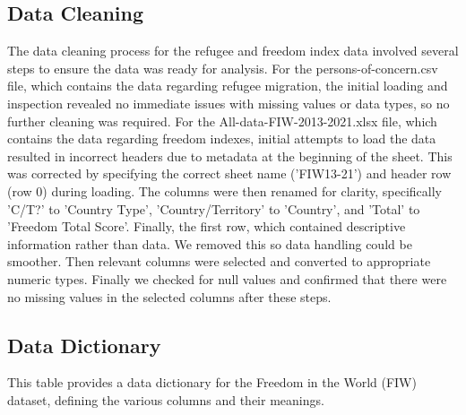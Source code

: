 \documentclass{article}
\theoremstyle{plain}
\theoremstyle{definition}
\theoremstyle{remark}
\begin{document}
\subsection{Data Cleaning}
The data cleaning process for the refugee and freedom index data involved several steps to ensure the data was ready for analysis. For the persons-of-concern.csv file, which contains the data regarding refugee migration, the initial loading and inspection revealed no immediate issues with missing values or data types, so no further cleaning was required. For the All-data-FIW-2013-2021.xlsx file, which contains the data regarding freedom indexes, initial attempts to load the data resulted in incorrect headers due to metadata at the beginning of the sheet. This was corrected by specifying the correct sheet name ('FIW13-21') and header row (row 0) during loading. The columns were then renamed for clarity, specifically 'C/T?' to 'Country Type', 'Country/Territory' to 'Country', and 'Total' to 'Freedom Total Score'. Finally, the first row, which contained descriptive information rather than data. We removed this so data handling could be smoother. Then relevant columns were selected and converted to appropriate numeric types. Finally we checked for null values and confirmed that there were no missing values in the selected columns after these steps.

\subsection{Data Dictionary}
This table provides a data dictionary for the Freedom in the World (FIW) dataset, defining the various columns and their meanings.
\end{document}
